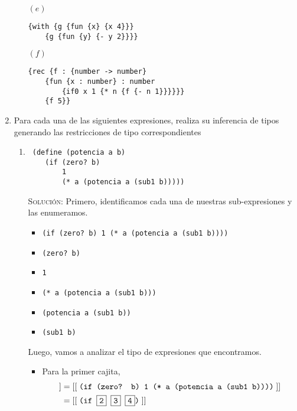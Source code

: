 \documentclass[letterpaper,11pt]{article}
\begin{document}
\begin{enumerate}
\begin{itemize}
\begin{itemize}
        \end{itemize}
        \item [$(e)$]\begin{verbatim}{with {g {fun {x} {x 4}}}
    {g {fun {y} {- y 2}}}}
        \end{verbatim}
        \item [$(f)$]\begin{verbatim}{rec {f : {number -> number}
    {fun {x : number} : number
        {if0 x 1 {* n {f {- n 1}}}}}}
    {f 5}}
        \end{verbatim}
    \end{itemize}
    
    \item Para cada una de las siguientes expresiones, realiza su inferencia 
    de tipos generando las restricciones de tipo correspondientes
    \begin{enumerate}
        \item 
        \begin{verbatim} (define (potencia a b)
    (if (zero? b)
        1
        (* a (potencia a (sub1 b)))))
        \end{verbatim}
        
        \textsc{Solución:} Primero, identificamos cada una de nuestras 
        sub-expresiones y las enumeramos.
        \begin{itemize}
            \item {} \texttt{(if (zero? b) 1 (* a (potencia a (sub1 b))))}

            \item {} \texttt{(zero? b)}

            \item {} \texttt{1}

            \item {} \texttt{(* a (potencia a (sub1 b)))}

            \item {} \texttt{(potencia a (sub1 b))}

            \item {} \texttt{(sub1 b)}
        \end{itemize}
        
        Luego, vamos a analizar el tipo de expresiones que encontramos.
        \begin{itemize}
            \item Para la primer cajita, 
            \begin{align*}
                [[ \; \fbox{1} \; ]]
                &= [[ \; \texttt{(if (zero? b) 1 (* a (potencia a (sub1 b))))} \; ]] \\
                &= [[ \; \texttt{(if \fbox{2} \fbox{3} \fbox{4})} \; ]]
            \end{align*}
            

\end{itemize}
\end{enumerate}
\end{enumerate}
\end{document}
